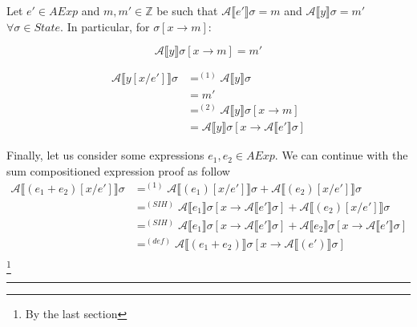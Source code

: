 \documentclass{article}
\begin{document}
\begin{enumerate}
\begin{enumerate}
        Let $e' \in AExp$ and $m, m' \in \mathbb Z$ be such that $\mathcal{A}\llbracket e' \rrbracket \sigma = m$ and $\mathcal{A}\llbracket y \rrbracket \sigma = m'$ $\forall \sigma \in State$. In particular, for $\sigma[x \rightarrow m]$:
        
        \begin{equation}\tag{2}
        \mathcal{A}\llbracket y \rrbracket \sigma[x \rightarrow m] = m'
        \end{equation}
        
       \begin{equation*}
        \begin{split}
        \mathcal{A}\llbracket y[x/e'] \rrbracket \sigma & =^{(1)} \mathcal{A}\llbracket y \rrbracket \sigma \\
        & = m'\\
        & =^{(2)} \mathcal{A}\llbracket y \rrbracket \sigma[x \rightarrow m] \\
        & = \mathcal{A}\llbracket y \rrbracket \sigma[x \rightarrow \mathcal{A}\llbracket e' \rrbracket \sigma]
        \end{split}
        \end{equation*}

        Finally, let us consider some expressions $e_1, e_2 \in AExp$. We can continue with the sum compositioned expression proof as follow
        \begin{equation*}
        \begin{split}
        \mathcal{A}\llbracket (e_1 + e_2)[x/e'] \rrbracket \sigma & =^{(1)} \mathcal{A}\llbracket (e_1)[x/e'] \rrbracket \sigma + \mathcal{A}\llbracket (e_2)[x/e'] \rrbracket \sigma \\
        & =^{(SIH)} \mathcal{A}\llbracket e_1 \rrbracket \sigma [x \rightarrow \mathcal{A} \llbracket e'\rrbracket\sigma] + \mathcal{A}\llbracket (e_2)[x/e'] \rrbracket \sigma \\
        & =^{(SIH)} \mathcal{A}\llbracket e_1 \rrbracket \sigma [x \rightarrow \mathcal{A} \llbracket e'\rrbracket\sigma] + \mathcal{A}\llbracket e_2 \rrbracket \sigma [x \rightarrow \mathcal{A} \llbracket e'\rrbracket\sigma] \\
        & =^{(def)} \mathcal{A}\llbracket (e_1 + e_2) \rrbracket \sigma [x \rightarrow \mathcal{A} \llbracket (e')\rrbracket\sigma] \\
        \end{split}
        \end{equation*}
        \footnote{By the last section}

    \end{enumerate}
\end{enumerate}

\begin{flushright}\rule{0.7em}{0.7em}\end{flushright}
\end{document}
